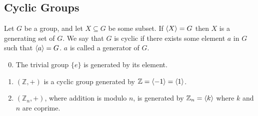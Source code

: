 \subsection{Cyclic Groups}
\begin{definition}
	Let $G$ be a group, and let $X \subseteq G$ be some subset. If $\langle X \rangle = G$ then $X$ is a generating set of $G$. We say that $G$ is cyclic if there exists some element $a$ in $G$ such that $\langle a \rangle = G$. $a$ is called a generator of $G$.
\end{definition}
\begin{enumerate}
	\setcounter{enumi}{-1}
	\item The trivial group $\{ e \}$ is generated by its element.
	\item $(\mathbb Z, +)$ is a cyclic group generated by $\mathbb Z = \langle -1 \rangle = \langle 1 \rangle$.
	\item $(\mathbb Z_n, +)$, where addition is modulo $n$, is generated by $\mathbb Z_n = \langle k \rangle$ where $k$ and $n$ are coprime.
\end{enumerate}
